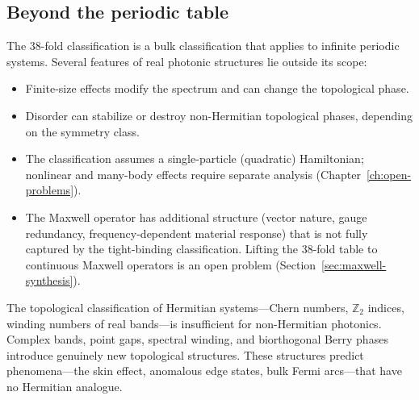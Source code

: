 \subsection{Beyond the periodic table}
\label{ssec:beyond-table}

The 38-fold classification is a bulk classification that applies to
infinite periodic systems. Several features of real photonic structures
lie outside its scope:
\begin{itemize}
 \item Finite-size effects modify the spectrum and can change the
 topological phase.
 \item Disorder can stabilize or destroy non-Hermitian topological
 phases, depending on the symmetry class.
 \item The classification assumes a single-particle (quadratic)
 Hamiltonian; nonlinear and many-body effects require separate
 analysis (Chapter~\ref{ch:open-problems}).
 \item The Maxwell operator has additional structure (vector nature,
 gauge redundancy, frequency-dependent material response) that is
 not fully captured by the tight-binding classification. Lifting the
 38-fold table to continuous Maxwell operators is an open problem
 (Section~\ref{sec:maxwell-synthesis}).
\end{itemize}

\begin{takeaway}
The topological classification of Hermitian systems---Chern numbers,
$\mathbb{Z}_2$ indices, winding numbers of real bands---is insufficient
for non-Hermitian photonics. Complex bands, point gaps, spectral winding,
and biorthogonal Berry phases introduce genuinely new topological
structures. These structures predict phenomena---the skin effect,
anomalous edge states, bulk Fermi arcs---that have no Hermitian analogue.
\end{takeaway}
